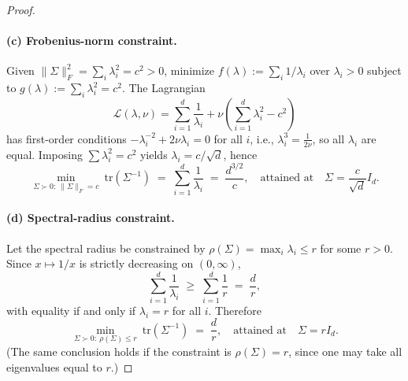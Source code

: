 \begin{proof}
\paragraph{(c) Frobenius-norm constraint.}
Given $\|\Sigma\|_F^2=\sum_i \lambda_i^2=c^2>0$, minimize $f(\lambda):=\sum_i 1/\lambda_i$ over $\lambda_i>0$ subject to $g(\lambda):=\sum_i \lambda_i^2=c^2$. The Lagrangian
\[
\mathcal{L}(\lambda,\nu)=\sum_{i=1}^d \frac{1}{\lambda_i} + \nu\left(\sum_{i=1}^d \lambda_i^2 - c^2\right)
\]
has first-order conditions $-\lambda_i^{-2}+2\nu\lambda_i=0$ for all $i$, i.e., $\lambda_i^3=\frac{1}{2\nu}$, so all $\lambda_i$ are equal. Imposing $\sum \lambda_i^2=c^2$ yields $\lambda_i=c/\sqrt{d}$, hence
\[
\min_{\Sigma\succ 0:\ \|\Sigma\|_F=c}\ \mathrm{tr}(\Sigma^{-1})
\;=\;\sum_{i=1}^d \frac{1}{\lambda_i}
\;=\;\frac{d^{3/2}}{c},
\quad\text{attained at}\quad
\Sigma=\frac{c}{\sqrt{d}}I_d.
\]
\paragraph{(d) Spectral-radius constraint.}
Let the spectral radius be constrained by $\rho(\Sigma)=\max_i \lambda_i\le r$ for some $r>0$. Since $x\mapsto 1/x$ is strictly decreasing on $(0,\infty)$,
\[
\sum_{i=1}^d \frac{1}{\lambda_i}
\;\ge\;\sum_{i=1}^d \frac{1}{r}
\;=\;\frac{d}{r},
\]
with equality if and only if $\lambda_i=r$ for all $i$. Therefore
\[
\min_{\Sigma\succ 0:\ \rho(\Sigma)\le r}\ \mathrm{tr}(\Sigma^{-1})
\;=\;\frac{d}{r},
\quad\text{attained at}\quad
\Sigma=rI_d.
\]
(The same conclusion holds if the constraint is $\rho(\Sigma)=r$, since one may take all eigenvalues equal to $r$.)

\end{proof}
